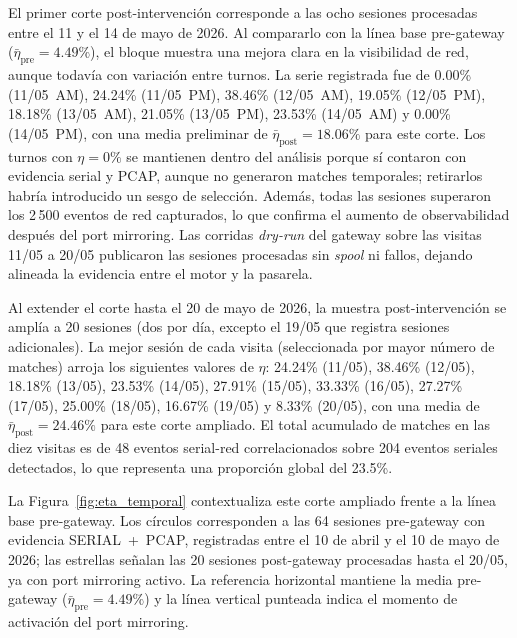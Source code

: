 El primer corte post-intervención corresponde a las ocho sesiones procesadas entre el 11 y el 14 de mayo de 2026. Al compararlo con la línea base pre-gateway ($\bar{\eta}_{\text{pre}}=4.49\%$), el bloque muestra una mejora clara en la visibilidad de red, aunque todavía con variación entre turnos. La serie registrada fue de 0.00\% (11/05~AM), 24.24\% (11/05~PM), 38.46\% (12/05~AM), 19.05\% (12/05~PM), 18.18\% (13/05~AM), 21.05\% (13/05~PM), 23.53\% (14/05~AM) y 0.00\% (14/05~PM), con una media preliminar de $\bar{\eta}_{\text{post}}=18.06\%$ para este corte. Los turnos con $\eta=0\%$ se mantienen dentro del análisis porque sí contaron con evidencia serial y \ac{PCAP}, aunque no generaron matches temporales; retirarlos habría introducido un sesgo de selección. Además, todas las sesiones superaron los 2\,500 eventos de red capturados, lo que confirma el aumento de observabilidad después del port mirroring. Las corridas \textit{dry-run} del gateway sobre las visitas 11/05 a 20/05 publicaron las sesiones procesadas sin \textit{spool} ni fallos, dejando alineada la evidencia entre el motor y la pasarela.

Al extender el corte hasta el 20 de mayo de 2026, la muestra post-intervención se amplía a 20 sesiones (dos por día, excepto el 19/05 que registra sesiones adicionales). La mejor sesión de cada visita (seleccionada por mayor número de matches) arroja los siguientes valores de $\eta$: 24.24\% (11/05), 38.46\% (12/05), 18.18\% (13/05), 23.53\% (14/05), 27.91\% (15/05), 33.33\% (16/05), 27.27\% (17/05), 25.00\% (18/05), 16.67\% (19/05) y 8.33\% (20/05), con una media de $\bar{\eta}_{\text{post}}=24.46\%$ para este corte ampliado. El total acumulado de matches en las diez visitas es de 48 eventos serial-red correlacionados sobre 204 eventos seriales detectados, lo que representa una proporción global del 23.5\%.

La Figura~\ref{fig:eta_temporal} contextualiza este corte ampliado frente a la línea base pre-gateway. Los círculos corresponden a las 64 sesiones pre-gateway con evidencia SERIAL~+~PCAP, registradas entre el 10 de abril y el 10 de mayo de 2026; las estrellas señalan las 20 sesiones post-gateway procesadas hasta el 20/05, ya con port mirroring activo. La referencia horizontal mantiene la media pre-gateway ($\bar{\eta}_{\text{pre}}=4.49\%$) y la línea vertical punteada indica el momento de activación del port mirroring.

